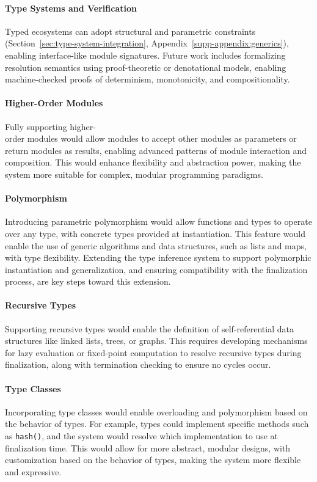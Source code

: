\documentclass[sigplan,screen]{acmart}
\begin{document}
\paragraph{Type Systems and Verification} Typed ecosystems can adopt structural and parametric constraints (Section~\ref{sec:type-system-integration}, Appendix~\ref{supp-appendix:generics}), enabling interface-like module signatures. Future work includes formalizing resolution semantics using proof-theoretic or denotational models, enabling machine-checked proofs of determinism, monotonicity, and compositionality.

\paragraph{Higher-Order Modules} Fully supporting higher-\\order modules would allow modules to accept other modules as parameters or return modules as results, enabling advanced patterns of module interaction and composition. This would enhance flexibility and abstraction power, making the system more suitable for complex, modular programming paradigms.

\paragraph{Polymorphism} Introducing parametric polymorph\-ism would allow functions and types to operate over any type, with concrete types provided at instantiation. This feature would enable the use of generic algorithms and data structures, such as lists and maps, with type flexibility. Extending the type inference system to support polymorphic instantiation and generalization, and ensuring compatibility with the finalization process, are key steps toward this extension.

\paragraph{Recursive Types} Supporting recursive types would enable the definition of self-referential data structures like linked lists, trees, or graphs. This requires developing mechanisms for lazy evaluation or fixed-point computation to resolve recursive types during finalization, along with termination checking to ensure no cycles occur.

\paragraph{Type Classes} Incorporating type classes would enable overloading and polymorphism based on the behavior of types. For example, types could implement specific methods such as \texttt{hash()}, and the system would resolve which implementation to use at finalization time. This would allow for more abstract, modular designs, with customization based on the behavior of types, making the system more flexible and expressive.
\end{document}
